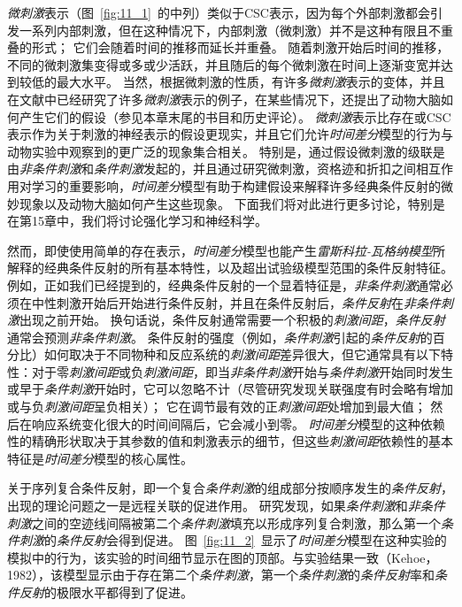 \textit{微刺激}表示（图~\ref{fig:11_1}~的中列）类似于CSC表示，因为每个外部刺激都会引发一系列内部刺激，但在这种情况下，内部刺激（微刺激）并不是这种有限且不重叠的形式；
它们会随着时间的推移而延长并重叠。
随着刺激开始后时间的推移，不同的微刺激集变得或多或少活跃，并且随后的每个微刺激在时间上逐渐变宽并达到较低的最大水平。
当然，根据微刺激的性质，有许多\textit{微刺激}表示的变体，并且在文献中已经研究了许多\textit{微刺激}表示的例子，在某些情况下，还提出了动物大脑如何产生它们的假设（参见本章末尾的书目和历史评论）。
\textit{微刺激}表示比存在或CSC表示作为关于刺激的神经表示的假设更现实，并且它们允许\textit{时间差分}模型的行为与动物实验中观察到的更广泛的现象集合相关。
特别是，通过假设微刺激的级联是由\textit{非条件刺激}和\textit{条件刺激}发起的，并且通过研究微刺激，资格迹和折扣之间相互作用对学习的重要影响，\textit{时间差分}模型有助于构建假设来解释许多经典条件反射的微妙现象以及动物大脑如何产生这些现象。
下面我们将对此进行更多讨论，特别是在第15章中，我们将讨论强化学习和神经科学。


然而，即使使用简单的存在表示，\textit{时间差分}模型也能产生\textit{雷斯科拉-瓦格纳模型}所解释的经典条件反射的所有基本特性，以及超出试验级模型范围的条件反射特征。
例如，正如我们已经提到的，经典条件反射的一个显着特征是，\textit{非条件刺激}通常必须在中性刺激开始后开始进行条件反射，并且在条件反射后，\textit{条件反射}在\textit{非条件刺激}出现之前开始。
换句话说，条件反射通常需要一个积极的\textit{刺激间距}，\textit{条件反射}通常会预测\textit{非条件刺激}。
条件反射的强度（例如，\textit{条件刺激}引起的\textit{条件反射}的百分比）如何取决于不同物种和反应系统的\textit{刺激间距}差异很大，但它通常具有以下特性：对于零\textit{刺激间距}或负\textit{刺激间距}，即当\textit{非条件刺激}开始与\textit{条件刺激}开始同时发生或早于\textit{条件刺激}开始时，它可以忽略不计（尽管研究发现关联强度有时会略有增加或与负\textit{刺激间距}呈负相关）；
它在调节最有效的正\textit{刺激间距}处增加到最大值；
然后在响应系统变化很大的时间间隔后，它会减小到零。
\textit{时间差分}模型的这种依赖性的精确形状取决于其参数的值和刺激表示的细节，但这些\textit{刺激间距}依赖性的基本特征是\textit{时间差分}模型的核心属性。


关于序列复合条件反射，即一个复合\textit{条件刺激}的组成部分按顺序发生的\textit{条件反射}，出现的理论问题之一是远程关联的促进作用。
研究发现，如果\textit{条件刺激}和\textit{非条件刺激}之间的空迹线间隔被第二个\textit{条件刺激}填充以形成序列复合刺激，那么第一个\textit{条件刺激}的\textit{条件反射}会得到促进。
图~\ref{fig:11_2}~显示了\textit{时间差分}模型在这种实验的模拟中的行为，该实验的时间细节显示在图的顶部。与实验结果一致（Kehoe，1982），该模型显示由于存在第二个\textit{条件刺激}，第一个\textit{条件刺激}的\textit{条件反射}率和\textit{条件反射}的极限水平都得到了促进。

